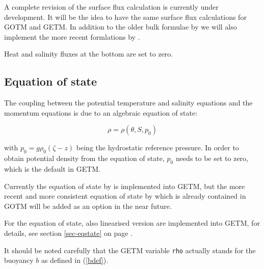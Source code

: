 A complete revision of the surface flux calculation is currently under
development. It will be the idea to have the same surface flux calculations
for GOTM and GETM. In addition to the older bulk formulae by \cite{KONDO75}
we will also implement the more recent formlations by 
\cite{FAIRALLea96}.

Heat and salinity fluxes at the bottom are set to zero. 

\subsection{Equation of state}\label{Section_state_eq}

The coupling between the potential temperature and salinity 
equations and the momentum
equations is due to an algebraic equation of state:

\begin{equation}\label{UNESCO} 
\rho=\rho(\theta,S,p_0)
\end{equation}

with $p_0=g\rho_0(\zeta-z)$ being the hydrostatic reference pressure.
In order to obtain potential density from the equation of state, 
$p_0$ needs to be set to zero, which is the default in GETM.

Currently the equation of state by \cite{FOFONOFFea83} is implemented
into GETM, but the more recent and more consistent equation of state
by \cite{JACKETTea05} which is already contained in GOTM
will be added as an option in the near future.

For the equation of state, also linearised version are implemented into
GETM, for details, see section \ref{sec-eqstate} on page \pageref{sec-eqstate}.

It should be noted carefully that the GETM variable {\tt rho} actually
stands for the buoyancy $b$ as defined in (\ref{bdef}).
